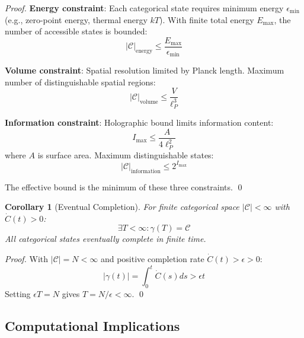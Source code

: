 \documentclass[12pt,a4paper]{article}
\newtheorem{corollary}{Corollary}
\begin{document}
\begin{proof}
\textbf{Energy constraint}: Each categorical state requires minimum energy $\epsilon_{\text{min}}$ (e.g., zero-point energy, thermal energy $kT$). With finite total energy $E_{\text{max}}$, the number of accessible states is bounded:
\begin{equation}
|\mathcal{C}|_{\text{energy}} \leq \frac{E_{\text{max}}}{\epsilon_{\text{min}}}
\end{equation}

\textbf{Volume constraint}: Spatial resolution limited by Planck length. Maximum number of distinguishable spatial regions:
\begin{equation}
|\mathcal{C}|_{\text{volume}} \leq \frac{V}{\ell_P^3}
\end{equation}

\textbf{Information constraint}: Holographic bound limits information content:
\begin{equation}
I_{\text{max}} \leq \frac{A}{4\ell_P^2}
\end{equation}
where $A$ is surface area. Maximum distinguishable states:
\begin{equation}
|\mathcal{C}|_{\text{information}} \leq 2^{I_{\text{max}}}
\end{equation}

The effective bound is the minimum of these three constraints. \qed
\end{proof}

\begin{corollary}[Eventual Completion]
\label{cor:eventual_completion}
For finite categorical space $|\mathcal{C}| < \infty$ with $\dot{C}(t) > 0$:
\begin{equation}
\exists T < \infty: \gamma(T) = \mathcal{C}
\end{equation}
All categorical states eventually complete in finite time.
\end{corollary}

\begin{proof}
With $|\mathcal{C}| = N < \infty$ and positive completion rate $\dot{C}(t) > \epsilon > 0$:
\begin{equation}
|\gamma(t)| = \int_0^t \dot{C}(s) ds > \epsilon t
\end{equation}
Setting $\epsilon T = N$ gives $T = N/\epsilon < \infty$. \qed
\end{proof}

\subsection{Computational Implications}
\end{document}

